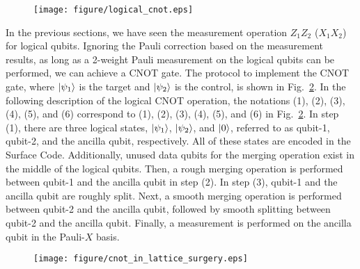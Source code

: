 \documentclass[a4paper,11pt]{ltjsarticle}
\begin{document}
{{        \begin{figure}[h]
            \centering
            \texttt{[image: figure/logical\_cnot.eps]}
            \vspace{0pt}\caption{}
            \label{logical_cnot}
            \vspace{-10pt}
        \end{figure}

        In the previous sections, we have seen the measurement operation $Z_1Z_2$ ($X_1X_2$) for logical qubits. Ignoring the Pauli correction based on the measurement results, as long as a 2-weight Pauli measurement on the logical qubits can be performed, we can achieve a CNOT gate. The protocol to implement the CNOT gate, where $\ket{\psi_1}$ is the target and $\ket{\psi_2}$ is the control, is shown in Fig.~\ref{cnot_in_lattice_surgery}. In the following description of the logical CNOT operation, the notations (1), (2), (3), (4), (5), and (6) correspond to (1), (2), (3), (4), (5), and (6) in Fig.~\ref{cnot_in_lattice_surgery}. In step (1), there are three logical states, $\ket{\psi_1}$, $\ket{\psi_2}$, and $\ket{0}$, referred to as qubit-1, qubit-2, and the ancilla qubit, respectively. All of these states are encoded in the Surface Code. Additionally, unused data qubits for the merging operation exist in the middle of the logical qubits. Then, a rough merging operation is performed between qubit-1 and the ancilla qubit in step (2). In step (3), qubit-1 and the ancilla qubit are roughly split. Next, a smooth merging operation is performed between qubit-2 and the ancilla qubit, followed by smooth splitting between qubit-2 and the ancilla qubit. Finally, a measurement is performed on the ancilla qubit in the Pauli-$X$ basis. 

        \begin{figure}[h]
            \centering
            \texttt{[image: figure/cnot\_in\_lattice\_surgery.eps]}
            \vspace{0pt}\caption{}
            \label{cnot_in_lattice_surgery}
            \vspace{-10pt}
        \end{figure}

    }
}
\end{document}
